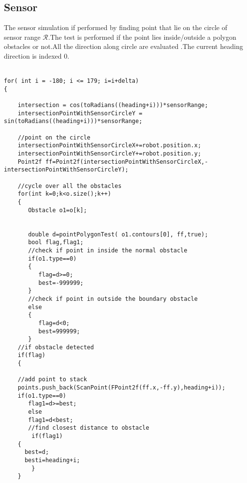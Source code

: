 \documentclass[fontsize=12pt, %
                             paper=a4, %
                             oneside, %
                             captions=tableheading,
                             index=totoc,
                             hyperref]{labbook}
\begin{document}
\subsection{Sensor}
The sensor simulation if performed by finding point that lie on the circle
of sensor range $\mathcal{R}$.The test is performed if the point lies
inside/outside a polygon obstacles or not.All the direction along
circle are evaluated .The current heading direction is indexed 0.
\\\\
\begin{verbatim}
for( int i = -180; i <= 179; i=i+delta)
{

    intersection = cos(toRadians((heading+i)))*sensorRange;
    intersectionPointWithSensorCircleY = sin(toRadians((heading+i)))*sensorRange;

    //point on the circle
    intersectionPointWithSensorCircleX+=robot.position.x;
    intersectionPointWithSensorCircleY+=robot.position.y;
    Point2f ff=Point2f(intersectionPointWithSensorCircleX,-intersectionPointWithSensorCircleY);
    
    //cycle over all the obstacles
    for(int k=0;k<o.size();k++)
    {
       Obstacle o1=o[k];


       double d=pointPolygonTest( o1.contours[0], ff,true);
       bool flag,flag1;
       //check if point in inside the normal obstacle
       if(o1.type==0)
       {
          flag=d>=0;
          best=-999999;
       }
       //check if point in outside the boundary obstacle
       else
       {
          flag=d<0;
          best=999999;
       }
	//if obstacle detected
	if(flag)
	{

	//add point to stack
	points.push_back(ScanPoint(FPoint2f(ff.x,-ff.y),heading+i));
	if(o1.type==0)
	   flag1=d>=best;
	   else
	   flag1=d<best;
	   //find closest distance to obstacle
        if(flag1)
	{
	  best=d;
	  besti=heading+i;
        }
	}
       
\end{verbatim}
\end{document}
